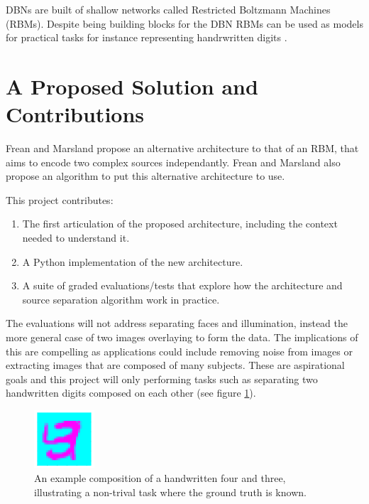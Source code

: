 DBNs are built of shallow networks called Restricted Boltzmann Machines (RBMs). Despite being building blocks for the DBN RBMs can be used as models for practical tasks for instance representing handrwritten digits \cite{fischer2014training}.

\section{A Proposed Solution and Contributions}

Frean and Marsland propose an alternative architecture to that of an RBM, that aims to encode two complex sources independantly. Frean and Marsland also propose an algorithm to put this alternative architecture to use.

This project contributes:
\begin{enumerate}[$\mathcal{C}$1.]
  \item\label{item-c1} The first articulation of the proposed architecture, including the context needed to understand it.
  \item\label{item-c2} A Python implementation of the new architecture.
  \item\label{item-c3} A suite of graded evaluations/tests that explore how the architecture and source separation algorithm work in practice.
\end{enumerate}
The evaluations will not address separating faces and illumination, instead the more general case of two images overlaying to form the data. The implications of this are compelling as applications could include removing noise from images or extracting images that are composed of many subjects. These are aspirational goals and this project will only performing tasks such as separating two handwritten digits composed on each other (see figure \ref{F:Composition-Example}).

\begin{figure}[h]
\begin{center}
  \includegraphics[width = 0.2\textwidth]{Assets/composition-example.png}
\caption{An example composition of a handwritten four and three, illustrating a non-trival task where the ground truth is known.}
\label{F:Composition-Example}
\end{center}
\end{figure}


